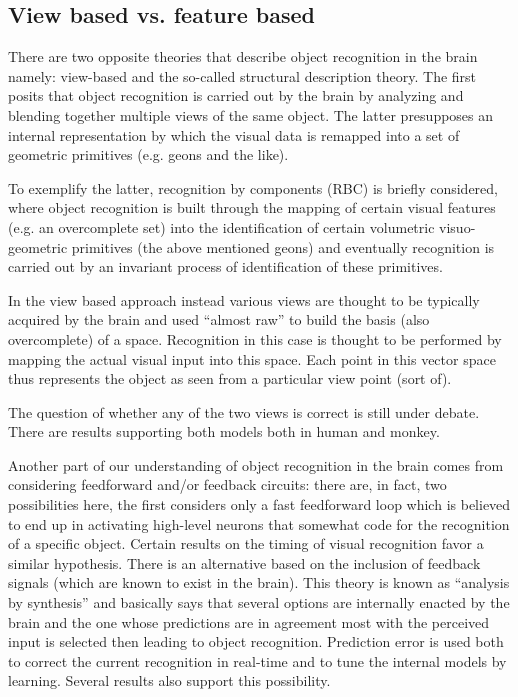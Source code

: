 

\subsection{View based vs. feature based}

There are two opposite theories that describe object recognition in the brain namely: view-based and the so-called structural description theory. The first posits that object recognition is carried out by the brain by analyzing and blending together multiple views of the same object. The latter presupposes an internal representation by which the visual data is remapped into a set of geometric primitives (e.g. geons and the like).

To exemplify the latter, recognition by components (RBC) is briefly considered, where object recognition is built through the mapping of certain visual features (e.g. an overcomplete set) into the identification of certain volumetric visuo-geometric primitives (the above mentioned geons) and eventually recognition is carried out by an invariant process of identification of these primitives.

In the view based approach instead various views are thought to be typically acquired by the brain and used ``almost raw'' to build the basis (also overcomplete) of a space. Recognition in this case is thought to be performed by mapping the actual visual input into this space. Each point in this vector space thus represents the object as seen from a particular view point (sort of).

The question of whether any of the two views is correct is still under debate. There are results supporting both models both in human and monkey.

Another part of our understanding of object recognition in the brain comes from considering feedforward and/or feedback circuits: there are, in fact, two possibilities here, the first considers only a fast feedforward loop which is believed to end up in activating high-level neurons that somewhat code for the recognition of a specific object. Certain results on the timing of visual recognition favor a similar hypothesis. There is an alternative based on the inclusion of feedback signals (which are known to exist in the brain). This theory is known as ``analysis by synthesis'' and basically says that several options are internally enacted by the brain and the one whose predictions are in agreement most with the perceived input is selected then leading to object recognition. Prediction error is used both to correct the current recognition in real-time and to tune the internal models by learning. Several results also support this possibility.


